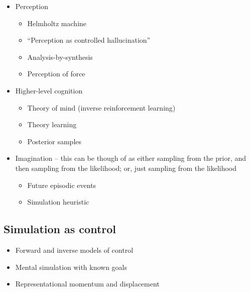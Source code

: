 \documentclass[12pt]{article}
\begin{document}
\begin{itemize}

\item Perception
    \begin{itemize}
    \item Helmholtz machine \citep{Dayan1995}
    \item ``Perception as controlled hallucination'' \citep{Grush2004}
    \item Analysis-by-synthesis \citep{Yuille2006,Bever2010}
    \item Perception of force \citep{White2012a,White2012}
    \end{itemize}

\item Higher-level cognition
    \begin{itemize}
    \item Theory of mind (inverse reinforcement learning) \citep{Stich1992,Gopnik1992}
    \item Theory learning \citep{Ullman2012}
    \item Posterior samples \citep{Vul2014,Lieder2012}
    \end{itemize}

\item Imagination -- this can be though of as either sampling from the prior, and then sampling from the likelihood; or, just sampling from the likelihood
    \begin{itemize}
    \item Future episodic events \citep{Schacter2012}
    \item Simulation heuristic \citep{Kahneman1981}
    \end{itemize}

\end{itemize}

\subsection*{Simulation as control}

\begin{itemize}
\item Forward and inverse models of control \citep{Grush2004,Kawato1999,Flanagan2003,Clark2013}
\item Mental simulation with known goals \citep{Flusberg2011,Parsons1994,Schwartz1999a}
\item Representational momentum and displacement \citep{Freyd1984,Freyd1988,Hubbard2005}
\end{itemize}
\end{document}
